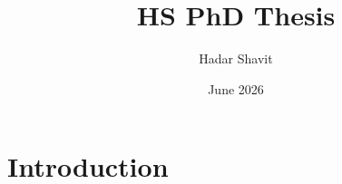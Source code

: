 \documentclass{article}
\title{HS PhD Thesis}
\author{Hadar Shavit}
\date{June 2026}
\begin{document}
\maketitle

\section{Introduction}
\end{document}
